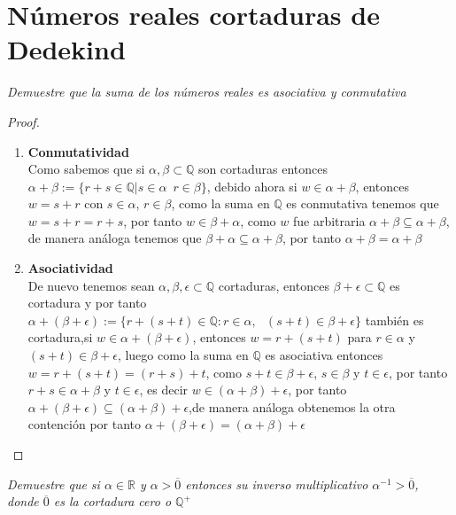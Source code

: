 \documentclass[11pt,letterpaper]{article}
\newcommand{\R}{\mathbb{R}}
\newcommand{\Q}{\mathbb{Q}}
\begin{document}
\section{N\'umeros reales cortaduras de Dedekind}
\begin{tcolorbox}[
	title = \textcolor{black}{\textcolor{white}{Problema 1}},]
\textit{Demuestre que la suma de los n\'umeros reales es asociativa y conmutativa
}
\end{tcolorbox}
\begin{proof}\,\\
    \begin{enumerate}
         \item\textbf{Conmutatividad}\,\\
        Como sabemos que si $\alpha,\beta\subset \Q$ son cortaduras entonces $\alpha+\beta:=\{r+s\in \Q|s\in\alpha\,\,\,r\in \beta\}$, debido
        ahora si $w\in \alpha +\beta$, entonces $w=s+r$ con $s\in \alpha$, $r\in \beta$, como la suma en $\Q$ es conmutativa
        tenemos que $w=s+r=r+s$, por tanto $w\in \beta+\alpha$, como $w$ fue arbitraria $\alpha+\beta\subseteq\alpha+\beta$, de manera
        an\'aloga tenemos que $\beta+\alpha\subseteq\alpha+\beta$, por tanto $\alpha+\beta=\alpha+\beta$
        \item \textbf{Asociatividad}\,\\
        De nuevo tenemos sean $\alpha,\beta,\epsilon\subset\Q$ cortaduras, entonces $\beta+\epsilon\subset\Q$ es cortadura y por tanto $\alpha+(\beta+\epsilon):=\{r+(s+t)\in \Q:r\in \alpha,\,\,\,\,(s+t)\in \beta+\epsilon\}$
        tambi\'en es cortadura,si $w\in \alpha+(\beta+\epsilon)$, entonces $w=r+(s+t)$ para $r\in \alpha$ y $(s+t)\in\beta+\epsilon$, luego
        como la suma en $\Q$ es asociativa entonces $w=r+(s+t)=(r+s)+t$, como $s+t\in \beta+\epsilon$, $s\in \beta$ y $t\in \epsilon$, por tanto $r+s\in \alpha+\beta$ y $t\in \epsilon$, es decir $w\in (\alpha+\beta)+\epsilon$, por tanto
        $\alpha+(\beta+\epsilon)\subseteq(\alpha+\beta)+\epsilon$,de manera an\'aloga obtenemos la otra contenci\'on por tanto
        $\alpha+(\beta+\epsilon)=(\alpha+\beta)+\epsilon$
    \end{enumerate}
\end{proof}
\begin{tcolorbox}[
	title = \textcolor{black}{\textcolor{white}{Problema 2}},]
\textit{Demuestre que si $\alpha \in \R$ y $\alpha>\overline{0}$ entonces su inverso
multiplicativo $\alpha^{-1}>\overline{0}$, donde $\overline{0}$ es la cortadura cero o $\Q^{+}$
}
\end{tcolorbox}
\end{document}
